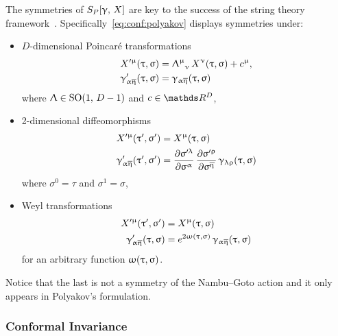 The symmetries of $S_P\qty[\upgamma,\, X]$ are key to the success of the string theory framework~\cite{Polchinski:1998:StringTheoryIntroduction}.
Specifically~\eqref{eq:conf:polyakov} displays symmetries under:
\begin{itemize}
  \item $D$-dimensional Poincaré transformations
    \begin{equation}
      \begin{split}
        X'^{\mu}\qty(\tau, \sigma)
        & =
        \tensor{\Lambda}{^{\mu}_{\nu}}\, X^{\nu}\qty(\tau, \sigma) + c^{\mu},
        \\
        \gamma'_{\alpha\beta}\qty(\tau, \sigma)
        & =
        \gamma_{\alpha\beta}\qty(\tau, \sigma)
      \end{split}
    \end{equation}
    where $\Uplambda \in \mathrm{SO}(1,\, D-1)$ and $c \in \R^D$,

  \item 2-dimensional diffeomorphisms
    \begin{equation}
      \begin{split}
        X'^{\mu}\qty(\tau', \sigma')
        & =
        X^{\mu}\qty(\tau, \sigma)
        \\
        \gamma'_{\alpha\beta}\qty(\tau', \sigma')
        & =
        \pdv{\sigma'^{\lambda}}{\sigma^{\alpha}}\,
        \pdv{\sigma'^{\rho}}{\sigma^{\beta}}\,
        \gamma_{\lambda\rho}\qty(\tau, \sigma)
      \end{split}
    \end{equation}
    where $\sigma^0 = \tau$ and $\sigma^1 = \sigma$,

  \item Weyl transformations
    \begin{equation}
      \begin{split}
        X'^{\upmu}\qty(\uptau', \upsigma')
        & =
        X^{\upmu}\qty(\uptau, \upsigma)
        \\
        \upgamma'_{\upalpha\overline{\upeta}}\qty(\uptau, \upsigma)
        & =
        e^{2 \upomega\qty(\uptau, \upsigma)}\, \upgamma_{\upalpha\overline{\upeta}}\qty(\uptau, \upsigma)
      \end{split}
    \end{equation}
    for an arbitrary function $\upomega\qty(\uptau, \upsigma)$.
\end{itemize}
Notice that the last is not a symmetry of the Nambu--Goto action and it only appears in Polyakov's formulation.


\subsubsection{Conformal Invariance}

